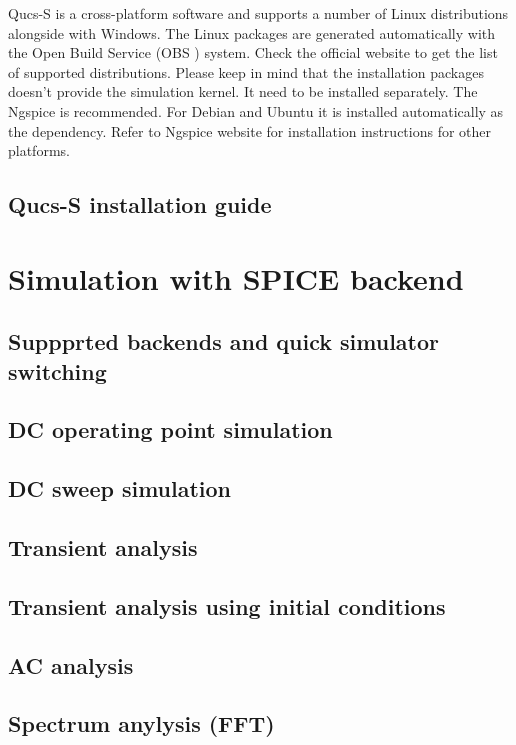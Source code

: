 Qucs-S is a cross-platform software and supports a number of Linux distributions alongside with Windows\texttrademark. The Linux packages are generated automatically with the Open Build Service (OBS ) system. Check the official website to get the list of supported distributions. Please keep in mind that the installation packages doesn't provide the simulation kernel. It need to be installed separately. The Ngspice is recommended. For Debian and Ubuntu it is installed automatically as the dependency. Refer to Ngspice website for installation instructions for other platforms.

\subsection{Qucs-S installation guide}

\section{Simulation with SPICE backend}

\subsection{Suppprted backends and quick simulator switching}

\subsection{DC operating point simulation}

\subsection{DC sweep simulation}

\subsection{Transient analysis}

\subsection{Transient analysis using initial conditions}

\subsection{AC analysis}

\subsection{Spectrum anylysis (FFT)}

